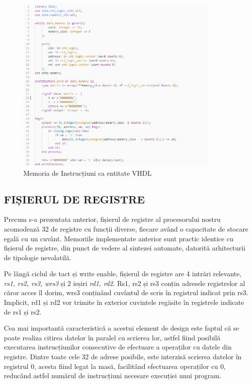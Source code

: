 \documentclass[12pt]{article}
\begin{document}
 \begin{figure}[h!]
 \includegraphics[width=0.9\textwidth]{datamemcode.png}
 \centering
 \caption{Memoria de Instrucțiuni ca entitate VHDL}
 \label{Figura:33}
 \end{figure}

 \subsection{FIȘIERUL DE REGISTRE}
 
 Precum s-a prezentata anterior, fișierul de registre al procesorului nostru acomodează 32 de registre cu funcții diverse, fiecare având o capacitate de stocare egală cu un cuvânt. Memoriile implementate anterior sunt practic identice cu fișierul de registre, din punct de vedere al sintezei automate,  datorită arhitecturii de tipologie nevolatilă.
 
 Pe lângă ciclul de tact și write enable, fișierul de registre are 4 intrări relevante,  \textit{rs1, rs2, rs3, wrs3} și 2 ieșiri \textit{rd1, rd2}. Rs1, rs2 și rs3 conțin adresele registrelor al căror acces îl dorim, wrs3 conținând cuvântul de scris în registrul indicat prin rs3. Implicit, rd1 și rd2 vor trimite în exterior cuvintele regăsite în registrele indicate de rs1 și rs2.
 
  Cea mai importantă caracteristică a acestui element de design este faptul că se poate realiza citirea datelor în paralel cu scrierea lor, astfel fiind posibilă executarea instrucțiunilor consecutive de efectuare a operaților cu datele din registre. Dintre toate cele 32 de adrese posibile, este interzisă scrierea datelor în registrul 0, acesta fiind legat la masă, facilitând efectuarea operaților cu 0, reducând astfel numărul de instrucțiuni necesare execuției unui program.
  
\end{document}
